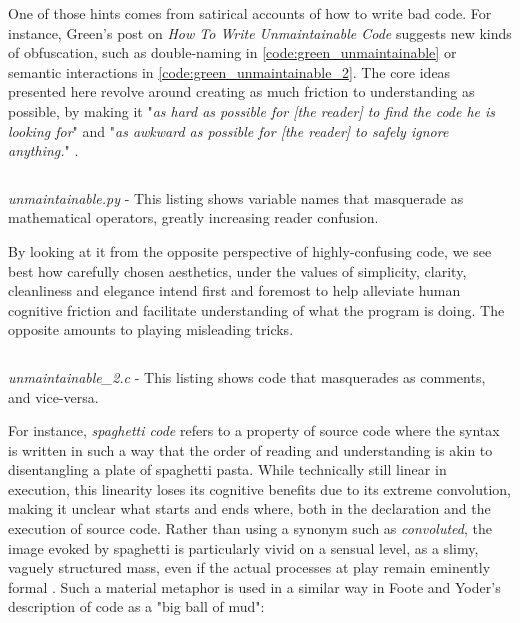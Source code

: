 One of those hints comes from satirical accounts of how to write bad code. For instance, Green's post on \emph{How To Write Unmaintainable Code} suggests new kinds of obfuscation, such as double-naming in \autoref{code:green_unmaintainable} or semantic interactions in \autoref{code:green_unmaintainable_2}. The core ideas presented here revolve around creating as much friction to understanding as possible, by making it "\emph{as hard as possible for [the reader] to find the code he is looking for}" and "\emph{as awkward as possible for [the reader] to safely ignore anything.}" \citep{green_how_2006}.

\begin{listing}
  \inputminted{python}{./corpus/unmaintainable.py}
  \caption{\emph{unmaintainable.py} - This listing shows variable names that masquerade as mathematical operators, greatly increasing reader confusion.}
  \label{code:green_unmaintainable}
\end{listing}

By looking at it from the opposite perspective of highly-confusing code, we see best how carefully chosen aesthetics, under the values of simplicity, clarity, cleanliness and elegance intend first and foremost to help alleviate human cognitive friction and facilitate understanding of what the program is doing. The opposite amounts to playing misleading tricks.

\begin{listing}
  \inputminted{c}{./corpus/unmaintainable_2.c}
  \caption{\emph{unmaintainable\_2.c} - This listing shows code that masquerades as comments, and vice-versa.}
  \label{code:green_unmaintainable_2}
\end{listing}

For instance, \emph{spaghetti code} refers to a property of source code where the syntax is written in such a way that the order of reading and understanding is akin to disentangling a plate of spaghetti pasta. While technically still linear in execution, this linearity loses its cognitive benefits due to its extreme convolution, making it unclear what starts and ends where, both in the declaration and the execution of source code. Rather than using a synonym such as \emph{convoluted}, the image evoked by spaghetti is particularly vivid on a sensual level, as a slimy, vaguely structured mass, even if the actual processes at play remain eminently formal \citep{steele_macaroni_1977}. Such a material metaphor is used in a similar way in Foote and Yoder's description of code as a "big ball of mud":

